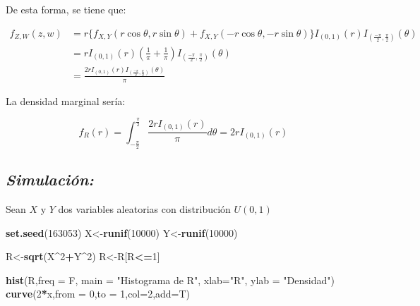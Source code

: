 \documentclass[]{article}
\newenvironment{Shaded}{\begin{snugshade}}{\end{snugshade}}
\newcommand{\KeywordTok}[1]{\textcolor[rgb]{0.13,0.29,0.53}{\textbf{#1}}}
\newcommand{\DataTypeTok}[1]{\textcolor[rgb]{0.13,0.29,0.53}{#1}}
\newcommand{\DecValTok}[1]{\textcolor[rgb]{0.00,0.00,0.81}{#1}}
\newcommand{\StringTok}[1]{\textcolor[rgb]{0.31,0.60,0.02}{#1}}
\newcommand{\OperatorTok}[1]{\textcolor[rgb]{0.81,0.36,0.00}{\textbf{#1}}}
\newcommand{\NormalTok}[1]{#1}
\begin{document}
De esta forma, se tiene que:

\begin{equation}
\begin{split}
f_{Z,W}(z,w)&=r\{ f_{X,Y}(r\cos\theta,r\sin\theta) + f_{X,Y}(-r\cos\theta,-r\sin\theta)  \}
I_{(0,1)}(r)I_{\left(\frac{-\pi}{2},\frac{\pi}{2}\right)}(\theta)\\
&=rI_{(0,1)}(r)\left(\frac{1}{\pi}+\frac{1}{\pi}\right)I_{\left(\frac{-\pi}{2},\frac{\pi}{2}\right)}(\theta)\\
&=\frac{2rI_{(0,1)}(r)I_{\left(\frac{-\pi}{2},\frac{\pi}{2}\right)}(\theta)}{\pi}
\end{split}
\end{equation}

La densidad marginal sería:

\begin{equation}
f_R(r)=\int_{-\frac{\pi}{2}}^{\frac{\pi}{2}}\frac{2rI_{(0,1)}(r)}{\pi}d\theta=2rI_{(0,1)}(r)
\end{equation}

\newpage

\subsection{\texorpdfstring{\emph{Simulación:}}{Simulación:}}\label{simulacion}

Sean \(X\) y \(Y\) dos variables aleatorias con distribución \(U(0,1)\)

\begin{Shaded}
\begin{Highlighting}[]
\KeywordTok{set.seed}\NormalTok{(}\DecValTok{163053}\NormalTok{)}
\NormalTok{X<-}\KeywordTok{runif}\NormalTok{(}\DecValTok{10000}\NormalTok{)}
\NormalTok{Y<-}\KeywordTok{runif}\NormalTok{(}\DecValTok{10000}\NormalTok{)}

\NormalTok{R<-}\KeywordTok{sqrt}\NormalTok{(X}\OperatorTok{^}\DecValTok{2}\OperatorTok{+}\NormalTok{Y}\OperatorTok{^}\DecValTok{2}\NormalTok{)}
\NormalTok{R<-R[R}\OperatorTok{<=}\DecValTok{1}\NormalTok{]}

\KeywordTok{hist}\NormalTok{(R,}\DataTypeTok{freq =}\NormalTok{ F, }\DataTypeTok{main =} \StringTok{"Histograma de R"}\NormalTok{, }\DataTypeTok{xlab=}\StringTok{"R"}\NormalTok{, }\DataTypeTok{ylab =} \StringTok{"Densidad"}\NormalTok{)}
\KeywordTok{curve}\NormalTok{(}\DecValTok{2}\OperatorTok{*}\NormalTok{x,}\DataTypeTok{from =} \DecValTok{0}\NormalTok{,}\DataTypeTok{to =} \DecValTok{1}\NormalTok{,}\DataTypeTok{col=}\DecValTok{2}\NormalTok{,}\DataTypeTok{add=}\NormalTok{T)}
\end{Highlighting}
\end{Shaded}
\end{document}
